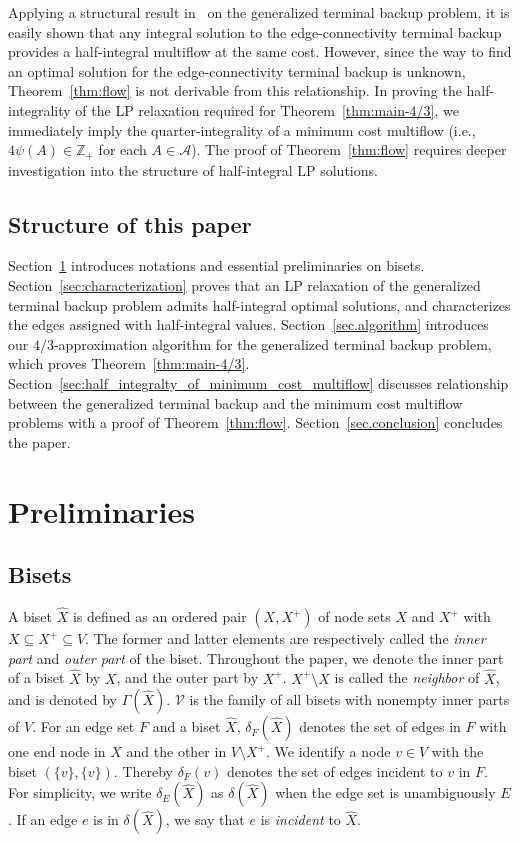 \documentclass{article}
\newcommand{\Vfam}{\mathcal{V}}
\newcommand{\Afam}{\mathcal{A}}
\newcommand{\Zset}{\mathbb{Z}}
\begin{document}
Applying a structural result in~\cite{Bernath2014} on the generalized terminal backup problem, 
it is easily shown that any integral solution to the edge-connectivity terminal backup
provides a half-integral multiflow at the same cost. 
However, since the way to find an optimal solution for the edge-connectivity terminal backup is
unknown, Theorem~\ref{thm:flow} is not derivable from this relationship.
In proving the half-integrality of the LP
relaxation required for Theorem~\ref{thm:main-4/3},
we immediately imply the quarter-integrality of a minimum cost multiflow (i.e.,
$4\psi(A)\in \Zset_+$ for each 
$A \in \Afam$). The proof of Theorem~\ref{thm:flow}
requires deeper investigation into the structure of half-integral LP solutions.

\subsection{Structure of this paper}

Section~\ref{sec:preliminaries} introduces notations and essential preliminaries on bisets.
Section~\ref{sec:characterization} proves that an LP relaxation of the generalized terminal backup
problem admits half-integral optimal solutions, and characterizes the edges assigned with half-integral
values.
Section~\ref{sec.algorithm} introduces our $4/3$-approximation algorithm for the generalized terminal
backup problem, which proves Theorem~\ref{thm:main-4/3}.
Section~\ref{sec:half_integralty_of_minimum_cost_multiflow}
discusses relationship between the generalized terminal backup 
and the minimum cost multiflow problems with a proof of Theorem~\ref{thm:flow}.
Section~\ref{sec.conclusion} concludes the paper.




\section{Preliminaries} 
\label{sec:preliminaries}

\subsection{Bisets}
A biset $\hat{X}$ is defined as an ordered pair $(X,X^+)$ of node sets $X$ and $X^+$ with 
$X \subseteq X^+ \subseteq V$. 
The former and latter elements are respectively called the \emph{inner part} and \emph{outer
part} of the biset. 
Throughout the paper, we denote the inner part of a biset $\hat{X}$ by $X$, and the outer
part by $X^+$. 
$X^+\setminus X$ is called the \emph{neighbor} of
$\hat{X}$, and is denoted by $\Gamma(\hat{X})$. 
$\Vfam$ is the family of all bisets with nonempty inner parts of $V$. 
For an edge set $F$ and a biset $\hat{X}$, $\delta_F(\hat{X})$
denotes the set of edges in $F$ with one end node in $X$ and the other in $V \setminus X^+$. 
We identify a node $v \in V$ with the biset $(\{v\},\{v\})$. Thereby $\delta_F(v)$ denotes the set
of edges incident to $v$ in $F$.
For simplicity, we
write $\delta_E(\hat{X})$ as $\delta(\hat{X})$ when the edge set is unambiguously $E$.
If an edge $e$ is in $\delta(\hat{X})$, we say that $e$ is \emph{incident} to $\hat{X}$.
\end{document}
